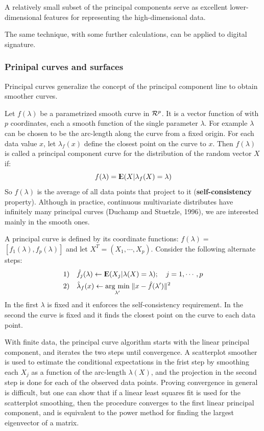 \documentclass[12pt, letterpaper]{article}
\theoremstyle{definition}
\newcommand{\E}{{\rm I\kern-.3em E}}
\DeclarePairedDelimiter\autobracket{(}{)}
\newcommand{\br}[1]{\autobracket*{#1}}
\newcommand{\argmin}[1]{\underset{#1}{\operatorname{arg}\,\operatorname{min}}\;}
\begin{document}
A relatively small subset of the principal components serve as excellent lower-dimensional features for representing the high-dimensional data.

The same technique, with some further calculations, can be applied to digital signature.

\subsubsection{Prinipal curves and surfaces}
Principal curves generalize the concept of the principal component line to obtain smoother curves. 

Let $f(\lambda)$ be a parametrized smooth curve in $\CMcal{R}^p$. It is a vector function of with $p$ coordinates, each a smooth function of the single parameter $\lambda$. For example $\lambda$ can be chosen to be the arc-length along the curve from a fixed origin. For each data value $x$, let $\lambda_f(x)$ define the closest point on the curve to $x$. Then $f(\lambda)$ is called a principal component curve for the distribution of the random vector $X$ if:
\begin{equation}
f(\lambda) = \E\br{X|\lambda_f(X) = \lambda}
\end{equation}
So $f(\lambda)$ is the average of all data points that project to it (\textbf{self-consistency} property). Although in practice, continuous multivariate distributes have infinitely many principal curves (Duchamp and Stuetzle, 1996), we are interested mainly in the smooth ones.

A principal curve is defined by its coordinate functions: $f(\lambda) =$ $[ f_1(\lambda), f_p(\lambda)]$ and let $X^T = (X_1, \cdots, X_p)$. Consider the following alternate steps:
\begin{equation}
\begin{aligned}
&1) \quad \hat{f}_j(\lambda)\leftarrow \E \br{X_j|\lambda(X) = \lambda}; \quad j=1,\cdots, p\\
&2) \quad \hat{\lambda}_f(x) \leftarrow \argmin{\lambda'}{\|x -\hat{f}(\lambda')\|^2}
\end{aligned}
\end{equation}
In the first $\lambda$ is fixed and it enforces the self-consistency requirement. In the second the curve is fixed and it finds the closest point on the curve to each data point.

With finite data, the principal curve algorithm starts with the linear principal component, and iterates the two steps until convergence.
A scatterplot smoother is used to estimate the conditional expectations in the frist step by smoothing each $X_j$ as a function of the arc-length $\lambda(X)$, and the projection in the second step is done for each of the observed data points. Proving convergence in general is difficult, but one can show that if a linear least squares fit is used for the scatterplot smoothing, then the procedure converges to the first linear principal component, and is equivalent to the power method for finding the largest eigenvector of a matrix.
\end{document}
